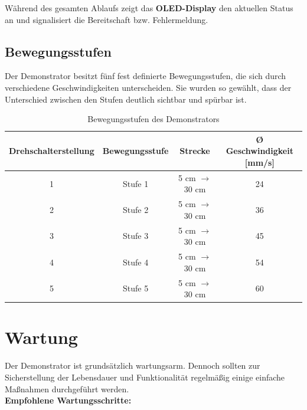 \documentclass[a4paper,12pt]{report}
\begin{document}
\noindent
Während des gesamten Ablaufs zeigt das \textbf{OLED-Display} den aktuellen Status an und signalisiert die Bereitschaft bzw. Fehlermeldung.

\setlength{\leftskip}{0pt} %
\newpage

	\section{Bewegungsstufen}

		
		Der Demonstrator besitzt fünf fest definierte Bewegungsstufen, die sich durch verschiedene Geschwindigkeiten unterscheiden. Sie wurden so gewählt, dass der Unterschied zwischen den Stufen deutlich sichtbar und spürbar ist.\\
		
		\begin{table}[h]
			\centering
			\begin{tabular}{|c|c|c|c|}
				\hline
				\textbf{Drehschalterstellung} & \textbf{Bewegungsstufe} & \textbf{Strecke} & \textbf{Ø Geschwindigkeit [mm/s]} \\ \hline
				1 & Stufe 1 & 5 cm $\rightarrow$ 30 cm & 24 \\ \hline
				2 & Stufe 2 & 5 cm $\rightarrow$ 30 cm & 36 \\ \hline
				3 & Stufe 3 & 5 cm $\rightarrow$ 30 cm & 45 \\ \hline
				4 & Stufe 4 & 5 cm $\rightarrow$ 30 cm & 54 \\ \hline
				5 & Stufe 5 & 5 cm $\rightarrow$ 30 cm & 60 \\ \hline
			\end{tabular}
			\caption{Bewegungsstufen des Demonstrators}
			\label{tab:bewegungsstufen}
		\end{table}
		
		\vspace{0.5em}
	
\chapter{Wartung}


Der Demonstrator ist grundsätzlich wartungsarm. Dennoch sollten zur Sicherstellung der Lebensdauer und Funktionalität regelmäßig einige einfache Maßnahmen durchgeführt werden. \\[0.75cm]
 

\textbf{Empfohlene Wartungsschritte:}

\setlength{\leftskip}{1.5em} 
\end{document}
